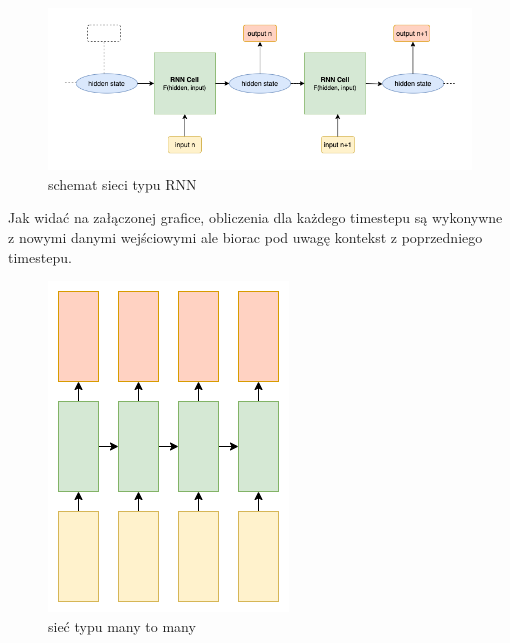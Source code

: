 \begin{figure}[!ht]
\includegraphics[width=\linewidth]{./images/rnn.png}
\caption{schemat sieci typu RNN}
\label{fig:test3}
\end{figure}
Jak widać na załączonej grafice, obliczenia dla każdego timestepu są wykonywne z nowymi danymi wejściowymi
ale biorac pod uwagę kontekst z poprzedniego timestepu. 
\begin{figure}
\vspace{-4mm}
\includegraphics[width=\linewidth]{./images/many-to-many.png}
\caption{sieć typu many to many}
\label{fig:test3}
\vspace{-4mm}
\end{figure}
